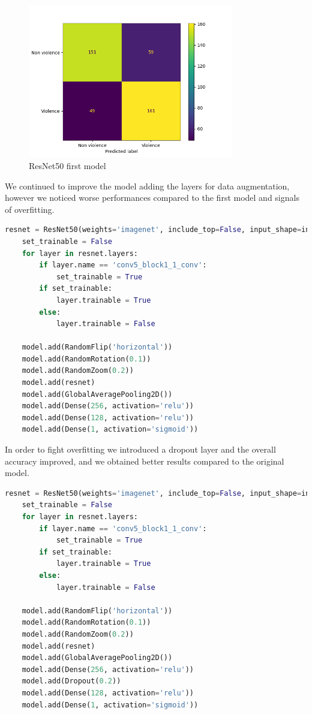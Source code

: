 \begin{figure}[]
    \centering
    \includegraphics[width=0.8\textwidth]{images/731a-resnet2D1-86ad-conf_matrix.png}
    \caption{ResNet50 first model}
    \label{fig:ResNet2d1}
\end{figure}

We continued to improve the model adding the layers for data augmentation, however we noticed worse performances compared to the first model and signals of overfitting. 
\begin{lstlisting}[language=python, caption={ResNet50 Second Test}, label={lst:resnet50CodeSecondTest}]
    resnet = ResNet50(weights='imagenet', include_top=False, input_shape=input_shape)
    set_trainable = False
    for layer in resnet.layers:
        if layer.name == 'conv5_block1_1_conv':
            set_trainable = True
        if set_trainable:
            layer.trainable = True
        else:
            layer.trainable = False

    model.add(RandomFlip('horizontal'))
    model.add(RandomRotation(0.1))
    model.add(RandomZoom(0.2))
    model.add(resnet)
    model.add(GlobalAveragePooling2D())
    model.add(Dense(256, activation='relu'))
    model.add(Dense(128, activation='relu'))
    model.add(Dense(1, activation='sigmoid'))
\end{lstlisting}

In order to fight overfitting we introduced a dropout layer and the overall accuracy improved, and we obtained better results compared to the original model. 

\begin{lstlisting}[language=python, caption={ResNet50 Third test}, label={lst:resnet50CodeThirdTest}]
    resnet = ResNet50(weights='imagenet', include_top=False, input_shape=input_shape)
    set_trainable = False
    for layer in resnet.layers:
        if layer.name == 'conv5_block1_1_conv':
            set_trainable = True
        if set_trainable:
            layer.trainable = True
        else:
            layer.trainable = False

    model.add(RandomFlip('horizontal'))
    model.add(RandomRotation(0.1))
    model.add(RandomZoom(0.2))
    model.add(resnet)
    model.add(GlobalAveragePooling2D())
    model.add(Dense(256, activation='relu'))
    model.add(Dropout(0.2))
    model.add(Dense(128, activation='relu'))
    model.add(Dense(1, activation='sigmoid'))
\end{lstlisting}


